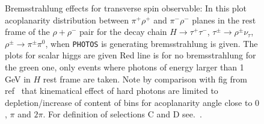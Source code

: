 \documentclass[]{Photos_interface_design}
\begin{document}
\begin{figure}[h!]
\centering
{}
\caption{Bremsstrahlung effects for transverse spin observable:
In this plot acoplanarity distribution between $\pi^+\rho^+$ and 
$\pi^-\rho^-$ planes in the rest frame of the $\rho+ \rho^-$ pair
for the decay
chain  $H\to \tau^+\tau^-$, $\tau^\pm \to \rho^\pm \nu_\tau$, 
$\rho^\pm \to \pi^\pm \pi^0$, when {\tt PHOTOS} is generating bremsstrahlung is given.
The plots for scalar higgs are given
Red line is for no bremsstrahlung for the green one,
only events where photons of energy larger than 1 GeV in $H$ rest frame are taken.
Note by comparison with fig from ref~\cite{tauolaC++} that kinematical effect
of hard photons are limited to depletion/increase of content of bins for acoplanarity angle close to $0$, $\pi$ and $2\pi$. For definition of selections C and D see.~\cite{Bower:2002zx}. \label{fig:acoplanarity}
}
\end{figure}
\end{document}
